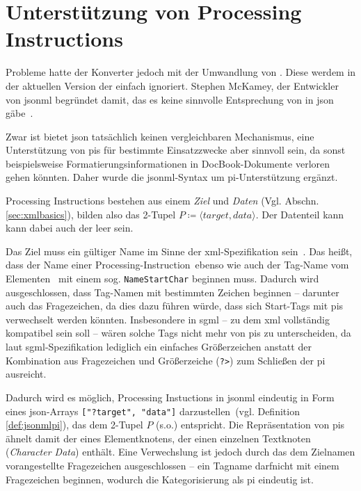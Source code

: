 \section{Unterstützung von Processing Instructions}

Probleme hatte der Konverter jedoch mit der Umwandlung von . Diese werdem in der aktuellen Version der einfach ignoriert. Stephen McKamey, der Entwickler von \acrshort{jsonml} begründet damit, das es keine sinnvolle Entsprechung von  in \acrshort{json} gäbe~\cite{mckamey2006xml}.

Zwar ist bietet \acrshort{json} tatsächlich keinen vergleichbaren Mechanismus, eine Unterstützung von \glspl{pi} für bestimmte Einsatzzwecke aber sinnvoll sein, da sonst beispielsweise Formatierungsinformationen in DocBook-Dokumente verloren gehen könnten. Daher wurde die \acrshort{jsonml}-Syntax um \acrshort{pi}-Unterstützung ergänzt.

Processing Instructions bestehen aus einem \emph{Ziel} und \emph{Daten} (Vgl. Abschn. \ref{sec:xmlbasics}), bilden also das 2-Tupel $P \coloneqq \langle target, data \rangle$. Der Datenteil kann kann dabei auch der leer sein.

Das Ziel muss ein gültiger Name im Sinne der \acrshort{xml}-Spezifikation sein~\cite[{Regel~[17]}]{maler2008xml}. Das heißt, dass der Name einer Processing-Instruction\ ebenso wie auch der Tag-Name vom Elementen~\cite[{Regel~[40]}]{maler2008xml} mit einem sog. \texttt{NameStartChar} beginnen muss. Dadurch wird ausgeschlossen, dass Tag-Namen mit bestimmten Zeichen beginnen -- darunter auch das Fragezeichen, da dies dazu führen würde, dass sich Start-Tags mit \glspl{pi} verwechselt werden könnten. Insbesondere in \acrshort{sgml} -- zu dem \acrshort{xml} vollständig kompatibel sein soll -- wären solche Tags nicht mehr von \glspl{pi} zu unterscheiden, da laut \acrshort{sgml}-Spezifikation lediglich ein einfaches Größerzeichen anstatt der Kombination aus Fragezeichen und Größerzeiche (\texttt{?>}) zum Schließen der \gls{pi} ausreicht.


Dadurch wird es möglich, Processing Instuctions in \acrshort{jsonml} eindeutig in Form eines \acrshort{json}-Arrays \texttt{["?target", "data"]} darzustellen~(vgl. Definition \ref{def:jsonmlpi}), das dem 2-Tupel $P$ (s.o.) entspricht. Die Repräsentation von \glspl{pi} ähnelt damit der eines Elementknotens, der einen einzelnen Textknoten (\emph{Character Data}) enthält. Eine Verwechslung ist jedoch durch das dem Zielnamen vorangestellte Fragezeichen ausgeschlossen -- ein Tagname darfnicht mit einem Fragezeichen beginnen, wodurch die Kategorisierung als \gls{pi} eindeutig ist.

